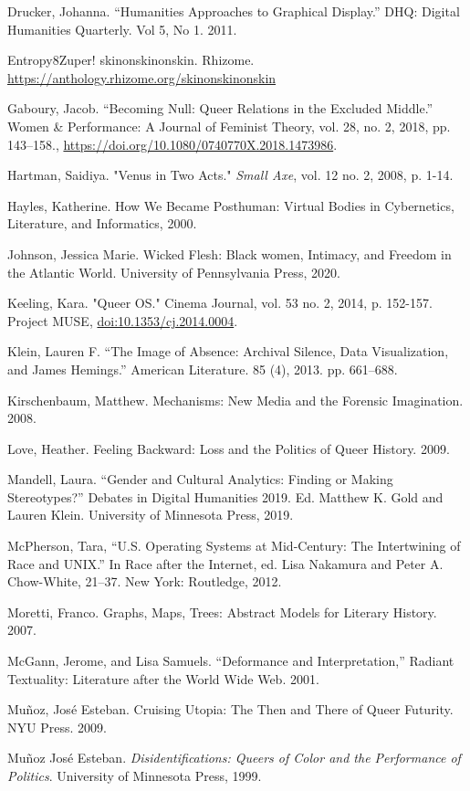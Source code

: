 \documentclass[11pt]{article}
\begin{document}
Drucker, Johanna. “Humanities Approaches to Graphical Display.” DHQ:
Digital Humanities Quarterly. Vol 5, No 1. 2011.

Entropy8Zuper!
skinonskinonskin. Rhizome. \url{https://anthology.rhizome.org/skinonskinonskin}

Gaboury, Jacob. “Becoming Null: Queer Relations in the Excluded
Middle.” Women \& Performance: A Journal of Feminist Theory, vol. 28,
no. 2, 2018, pp. 143–158.,
\url{https://doi.org/10.1080/0740770X.2018.1473986}.

Hartman, Saidiya. "Venus in Two Acts." \emph{Small Axe}, vol. 12 no. 2,
2008, p. 1-14.

Hayles, Katherine. How We Became Posthuman: Virtual Bodies in
Cybernetics, Literature, and Informatics, 2000.

Johnson, Jessica Marie. Wicked Flesh: Black women, Intimacy, and
Freedom in the Atlantic World. University of Pennsylvania Press, 2020.

Keeling, Kara. "Queer OS." Cinema Journal, vol. 53 no. 2, 2014,
p. 152-157. Project MUSE, \url{doi:10.1353/cj.2014.0004}.

Klein, Lauren F. “The Image of Absence: Archival Silence, Data
Visualization, and James Hemings.” American Literature. 85
(4), 2013. pp. 661–688.

Kirschenbaum, Matthew. Mechanisms: New Media and the Forensic
Imagination. 2008.

Love, Heather. Feeling Backward: Loss and the Politics of Queer
History. 2009.

Mandell, Laura. “Gender and Cultural Analytics: Finding or Making
Stereotypes?” Debates in Digital Humanities 2019. Ed. Matthew K. Gold
and Lauren Klein. University of Minnesota Press, 2019.

McPherson, Tara, “U.S. Operating Systems at Mid-Century: The
Intertwining of Race and UNIX.” In Race after the Internet, ed. Lisa
Nakamura and Peter A. Chow-White, 21–37. New York: Routledge, 2012.

Moretti, Franco. Graphs, Maps, Trees: Abstract Models for Literary
History. 2007.

McGann, Jerome, and Lisa Samuels. “Deformance and Interpretation,”
Radiant Textuality: Literature after the World Wide Web. 2001.

Muñoz, José Esteban. Cruising Utopia: The Then and There of Queer
Futurity. NYU Press. 2009.

Muñoz José Esteban. \emph{Disidentifications: Queers of Color and the
Performance of Politics}. University of Minnesota Press, 1999.
\end{document}
